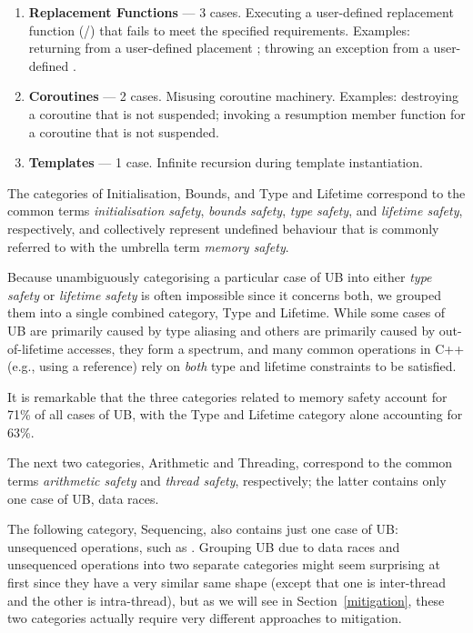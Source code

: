 \begin{enumerate}
\item \textbf{Replacement Functions} --- 3 cases. Executing a user-defined replacement function (/) that fails to meet the specified requirements. Examples: returning  from a user-defined placement ; throwing an exception from a user-defined .
\item \textbf{Coroutines} --- 2 cases. Misusing coroutine machinery. Examples: destroying a coroutine that is not suspended; invoking a resumption member function for a coroutine that is not suspended.
\item \textbf{Templates} --- 1 case. Infinite recursion during template instantiation.
\end{enumerate}

The categories of Initialisation, Bounds, and Type and Lifetime correspond to the common terms \emph{initialisation safety}, \emph{bounds safety}, \emph{type safety},  and \emph{lifetime safety}, respectively, and collectively represent undefined behaviour that is commonly referred to with the umbrella term \emph{memory safety}.

Because unambiguously categorising a particular case of UB into either \emph{type safety} or \emph{lifetime safety} is often impossible since it concerns both, we grouped them into a single combined category, Type and Lifetime. While some cases of UB are primarily caused by type aliasing and others are primarily caused by out-of-lifetime accesses, they form a spectrum, and many common operations in C++ (e.g., using a reference) rely on \emph{both} type and lifetime constraints to be satisfied.

It is remarkable that the three categories related to memory safety account for 71\% of all cases of UB, with the Type and Lifetime category alone accounting for 63\%.

The next two categories, Arithmetic and Threading, correspond to the common terms \emph{arithmetic safety} and \emph{thread safety}, respectively; the latter contains only one case of UB, data races.

The following category, Sequencing, also contains just one case of UB: unsequenced operations, such as \mbox{}. Grouping UB due to data races and unsequenced operations into two separate categories might seem surprising at first since they have a very similar same shape (except that one is inter-thread and the other is intra-thread), but as we will see in Section~\ref{mitigation}, these two categories actually require very different approaches to mitigation.

